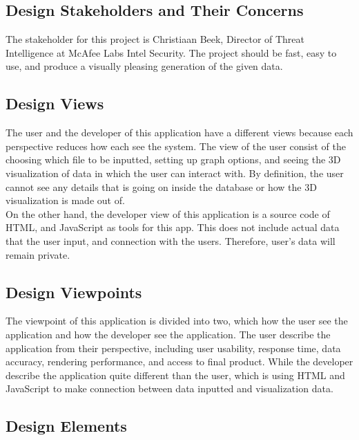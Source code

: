 \documentclass[journal,10pt,onecolumn,compsoc]{IEEEtran} \usepackage[margin=1.0in]{geometry} \usepackage{pdfpages}
\begin{document}
    \subsection{Design Stakeholders and Their Concerns}
    The stakeholder for this project is Christiaan Beek, Director of Threat Intelligence at McAfee Labs Intel Security. The project should be fast, easy to use, and produce a visually pleasing generation of the given data.
    \subsection{Design Views}
    The user and the developer of this application have a different views because each perspective reduces how each see the system. The view of the user consist of the choosing which file to be inputted, setting up graph options, and seeing the 3D visualization of data in which the user can interact with. By definition, the user cannot see any details that is going on inside the database or how the 3D visualization is made out of.\\
    On the other hand, the developer view of this application is a source code of HTML, and JavaScript as tools for this app. This does not include actual data that the user input, and connection with the users. Therefore, user's data will remain private.
    \subsection{Design Viewpoints}
    The viewpoint of this application is divided into two, which how the user see the application and how the developer see the application. The user describe the application from their perspective, including user usability, response time, data accuracy, rendering performance, and access to final product. While the developer describe the application quite different than the user, which is using HTML and JavaScript to make connection between data inputted and visualization data. 
    \subsection{Design Elements}
\end{document}

